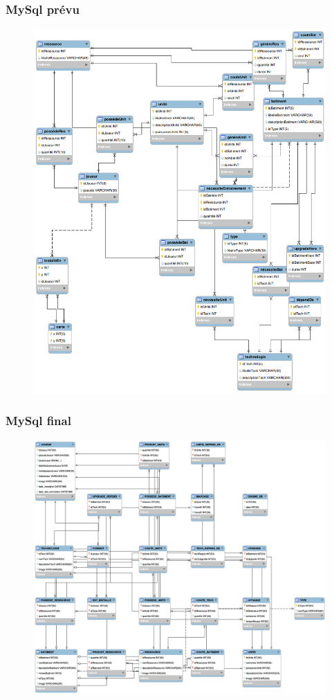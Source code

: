 \documentclass[11pt,a4paper]{article}
\begin{document}
\subsubsection{MySql prévu}
\begin{figure}[!h]
\includegraphics[scale=0.3]{./sql/last.png}
\end{figure}
\subsubsection{MySql final}
\begin{figure}[!h]
\includegraphics[scale=0.3]{./sql/final.png}
\end{figure}
\end{document}
